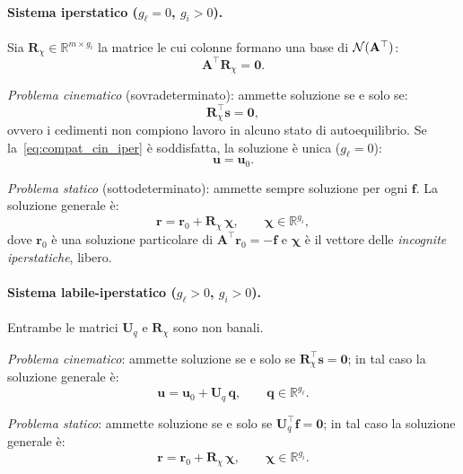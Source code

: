 \paragraph{Sistema iperstatico ($g_\ell = 0$,
	$g_i > 0$).}
Sia $\bm{R}_\chi \in \mathbb{R}^{m \times g_i}$
la matrice le cui colonne formano una base di
$\mathcal{N}(\mathbf{A}^{\top})$:
\begin{equation}\label{eq:ker_AT_iper}
	\bm{A}^{\top}\bm{R}_\chi = \bm{0}.
\end{equation}

\noindent\emph{Problema cinematico} (sovradeterminato):
ammette soluzione se e solo se:
\begin{equation}\label{eq:compat_cin_iper}
	\bm{R}_\chi^{\top}\bm{s} = \bm{0},
\end{equation}
ovvero i cedimenti non compiono lavoro in alcuno stato
di autoequilibrio. Se la~\eqref{eq:compat_cin_iper} è
soddisfatta, la soluzione è unica ($g_\ell = 0$):
\begin{equation}\label{eq:sol_iper_cin}
	\bm{u} = \bm{u}_0.
\end{equation}

\noindent\emph{Problema statico} (sottodeterminato):
ammette sempre soluzione per ogni $\bm{f}$. La soluzione
generale è:
\begin{equation}\label{eq:sol_iper_stat}
	\bm{r} = \bm{r}_0 + \bm{R}_\chi\,\bm{\chi},
	\qquad \bm{\chi} \in \mathbb{R}^{g_i},
\end{equation}
dove $\bm{r}_0$ è una soluzione particolare di
$\bm{A}^{\top}\bm{r}_0 = -\bm{f}$ e $\bm{\chi}$ è il
vettore delle \emph{incognite iperstatiche}, libero.

\paragraph{Sistema labile-iperstatico ($g_\ell > 0$,
	$g_i > 0$).}
Entrambe le matrici $\bm{U}_q$ e $\bm{R}_\chi$ sono non
banali.

\noindent\emph{Problema cinematico}: ammette soluzione
se e solo se $\bm{R}_\chi^{\top}\bm{s} = \bm{0}$;
in tal caso la soluzione generale è:
\begin{equation}\label{eq:sol_li_cin}
	\bm{u} = \bm{u}_0 + \bm{U}_q\,\bm{q},
	\qquad \bm{q} \in \mathbb{R}^{g_\ell}.
\end{equation}

\noindent\emph{Problema statico}: ammette soluzione
se e solo se $\bm{U}_q^{\top}\bm{f} = \bm{0}$;
in tal caso la soluzione generale è:
\begin{equation}\label{eq:sol_li_stat}
	\bm{r} = \bm{r}_0 + \bm{R}_\chi\,\bm{\chi},
	\qquad \bm{\chi} \in \mathbb{R}^{g_i}.
\end{equation}


